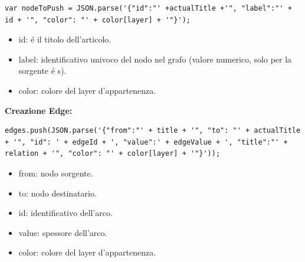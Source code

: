 \documentclass[11pt,a4paper]{article}
\begin{document}
\begin{lstlisting}[breaklines=true,style=java]
var nodeToPush = JSON.parse('{"id":"' +actualTitle +'", "label":"' + id + '", "color": "' + color[layer] + '"}');
\end{lstlisting}
\begin{itemize}
\item id: \'e il titolo dell'articolo.
\item label: identificativo univoco del nodo nel grafo (valore numerico, solo per la sorgente \'e s).
\item color: colore del layer d'appartenenza.
\newline\newline
\end{itemize}

\textbf{Creazione Edge:} 
\begin{lstlisting}[breaklines=true,style=java]
edges.push(JSON.parse('{"from":"' + title + '", "to": "' + actualTitle + '", "id": ' + edgeId + ', "value":' + edgeValue + ', "title":"' + relation + '", "color": "' + color[layer] + '"}'));
\end{lstlisting}
\begin{itemize}
\item from: nodo sorgente.
\item to: nodo destinatario.
\item id: identificativo dell'arco.
\item value: spessore dell'arco.
\item color: colore del layer d'appartenenza.
\end{itemize}


   
\newpage
\end{document}
